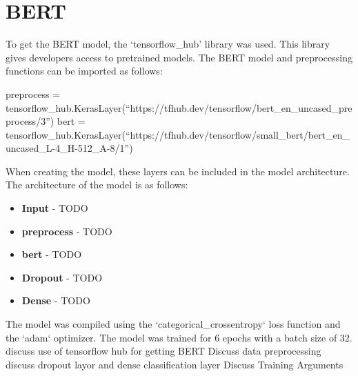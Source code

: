 \section{BERT}
To get the BERT model, the `tensorflow\_hub' library was used. This library gives developers access to pretrained models. The BERT model and preprocessing functions
can be imported as follows:
\begin{algorithm}
    \begin{algorithmic}
        \STATE preprocess = tensorflow\_hub.KerasLayer(``https://tfhub.dev/tensorflow/bert\_en\_uncased\_preprocess/3'')
        \STATE bert = tensorflow\_hub.KerasLayer(``https://tfhub.dev/tensorflow/small\_bert/bert\_en\_uncased\_L-4\_H-512\_A-8/1'')
    \end{algorithmic}
\end{algorithm}

When creating the model, these layers can be included in the model architecture. The architecture of the model is as follows:
\begin{itemize}
    \item \textbf{Input} - TODO
    \item \textbf{preprocess} - TODO
    \item \textbf{bert} - TODO
    \item \textbf{Dropout} - TODO
    \item \textbf{Dense} - TODO
\end{itemize}

The model was compiled using the `categorical\_crossentropy` loss function and the `adam` optimizer. The model was trained for 6 epochs with a batch size of 32.
discuss use of tensorflow hub for getting BERT
Discuss data preprocessing
discuss dropout layor and dense classification layer
Discuss Training Arguments
